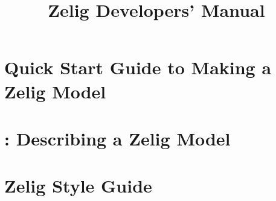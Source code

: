 \documentclass{book}
\title{Zelig Developers' Manual}
\begin{document}
\maketitle

\tableofcontents

\chapter[Quick Start Guide]{Quick Start Guide to Making a Zelig Model}


\chapter[\code{describe}]{: Describing a Zelig Model}


\chapter[\code{zelig2}]{}


\chapter[\code{param}]{}


\chapter[\code{qi}]{}


\chapter[Zelig Style Guide]{Zelig Style Guide}

\end{document}
